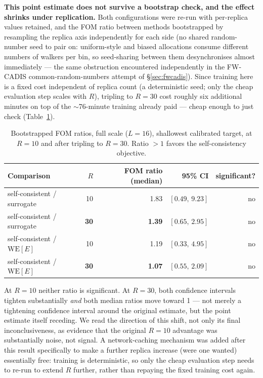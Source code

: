 \documentclass[a4paper,fleqn]{cas-sc}
\begin{document}
\textbf{This point estimate does not survive a bootstrap check, and the effect shrinks
	under replication.} Both configurations were re-run with per-replica values retained, and
the FOM ratio between methods bootstrapped by resampling the replica axis independently for
each side (no shared random-number seed to pair on: uniform-style and biased allocations
consume different numbers of walkers per bin, so seed-sharing between them desynchronises
almost immediately --- the same obstruction encountered independently in the FW-CADIS
common-random-numbers attempt of \S\ref{sec:fwcadis}). Since training here is a fixed cost
independent of replica count (a deterministic seed; only the cheap evaluation step scales
with $R$), tripling to $R=30$ cost roughly six additional minutes on top of the
$\sim$76-minute training already paid --- cheap enough to just check
(Table~\ref{tab:kimcaiboot}).

\begin{table}[H]
\centering\small
\caption{Bootstrapped FOM ratios, full scale ($L=16$), shallowest calibrated target, at
	$R=10$ and after tripling to $R=30$. Ratio $>1$ favors the self-consistency objective.}
\label{tab:kimcaiboot}
\begin{tabular}{lrrrr}
	\toprule
	Comparison & $R$ & FOM ratio (median) & 95\% CI & significant? \\
	\midrule
	self-consistent / surrogate & 10 & 1.83 & $[0.49,\,9.23]$ & no \\
	self-consistent / surrogate & \textbf{30} & \textbf{1.39} & $\mathbf{[0.65,\,2.95]}$ & no \\
	self-consistent / $\mathrm{WE}[E]$ & 10 & 1.19 & $[0.33,\,4.95]$ & no \\
	self-consistent / $\mathrm{WE}[E]$ & \textbf{30} & \textbf{1.07} & $\mathbf{[0.55,\,2.09]}$ & no \\
	\bottomrule
\end{tabular}
\end{table}

At $R=10$ neither ratio is significant. At $R=30$, both confidence intervals tighten
substantially \emph{and} both median ratios move toward 1 --- not merely a tightening
confidence interval around the original estimate, but the point estimate itself receding.
We read the direction of this shift, not only its final inconclusiveness, as evidence that
the original $R=10$ advantage was substantially noise, not signal. A network-caching
mechanism was added after this result specifically to make a further replica increase (were
one wanted) essentially free: training is deterministic, so only the cheap evaluation step
needs to re-run to extend $R$ further, rather than repaying the fixed training cost again.
\end{document}
